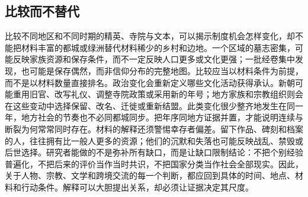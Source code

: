 \subsection{比较而不替代} 比较不同地区和不同时期的精英、寺院与文本，可以揭示制度机会怎样变化，却不能把材料丰富的都城或绿洲替代材料稀少的乡村和边地。一个区域的墓志密集，可能反映家族资源和保存条件，而不一定反映人口更多或文化更强；一批经卷集中发现，也可能是保存偶然，而非信仰分布的完整地图。比较应当以材料条件为前提，而不是以材料数量直接排名。政治变化会重新定义哪些文化活动获得承认。新朝可能重用旧官、改写礼仪、调整寺院政策或采用新的年号；地方家族和宗教组织则会在这些变动中选择保留、改名、迁徙或重新结盟。此类变化很少整齐地发生在同一年，地方社会的节奏也不必同都城同步。把年序同地方证据并置，才能说明连续与断裂为何常常同时存在。材料的解释还须警惕幸存者偏差。留下作品、碑刻和档案的人，往往拥有比一般人更多的资源；他们的沉默和失落也可能反映战乱、禁毁或后世选择。研究者能做的不是弥补所有缺口，而是让缺口限制结论：不把个别经验普遍化，不把后来的评价当作当时共识，不把国家分类当作社会全部现实。因此，关于人物、宗教、文学和跨境交流的每一个判断，都应回到具体的时间、地点、材料和行动条件。解释可以大胆提出关系，却必须让证据决定其尺度。
